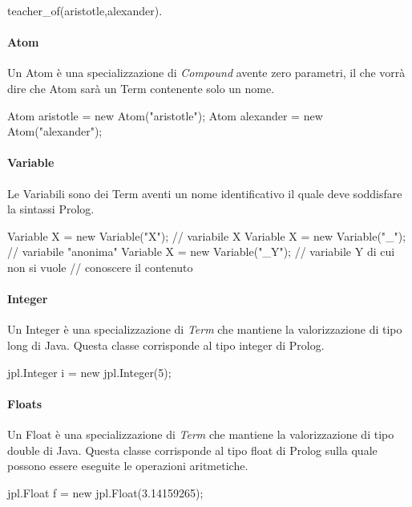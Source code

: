 \begin{prologcode}
	teacher_of(aristotle,alexander).
\end{prologcode}

\paragraph{Atom}
Un Atom è una specializzazione di \emph{Compound} avente zero parametri, il che vorrà dire che Atom sarà un Term contenente solo un nome.

\begin{javacode}
	Atom aristotle = new Atom("aristotle");
	Atom alexander = new Atom("alexander");
\end{javacode}

\paragraph{Variable}
Le Variabili sono dei Term aventi un nome identificativo il quale deve soddisfare la sintassi Prolog.

\begin{javacode}
	Variable X = new Variable("X");  //  variabile X
	Variable X = new Variable("_");  //  variabile "anonima"
	Variable X = new Variable("_Y"); // variabile Y di cui non si vuole 
	// conoscere il contenuto
\end{javacode}

\paragraph{Integer}
Un Integer è una specializzazione di \emph{Term} che mantiene la valorizzazione di tipo long di Java. Questa classe corrisponde al tipo integer di Prolog.

\begin{javacode}
	jpl.Integer i = new jpl.Integer(5);
\end{javacode}

\paragraph{Floats}
Un Float è una specializzazione di \emph{Term} che mantiene la valorizzazione di tipo double di Java. Questa classe corrisponde al tipo float di Prolog sulla quale possono essere eseguite le operazioni aritmetiche.

\begin{javacode}
	jpl.Float f = new jpl.Float(3.14159265);
\end{javacode}

